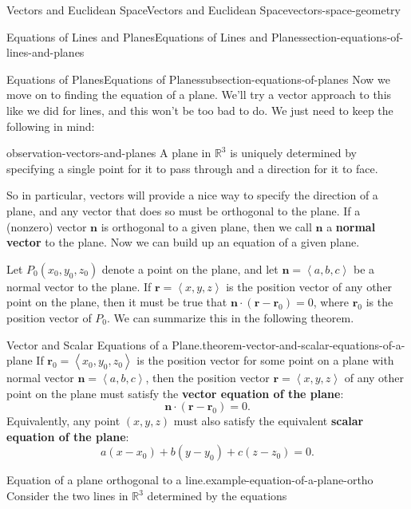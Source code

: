 \documentclass[oneside,10pt,]{book}
\newcommand{\terminology}[1]{\textbf{#1}}
\numberwithin{equation}{section}
\newcommand{\RR}{\mathbb{R}}
\newcommand{\vv}[1]{\mathbf{#1}}
\newcommand{\dotprod}[1]{\left\langle #1 \right\rangle}
\begin{document}
\begin{chapterptx}{Vectors and Euclidean Space}{}{Vectors and Euclidean Space}{}{}{vectors-space-geometry}
\begin{sectionptx}{Equations of Lines and Planes}{}{Equations of Lines and Planes}{}{}{section-equations-of-lines-and-planes}
\begin{subsectionptx}{Equations of Planes}{}{Equations of Planes}{}{}{subsection-equations-of-planes}
Now we move on to finding the equation of a plane. We'll try a vector approach to this like we did for lines, and this won't be too bad to do. We just need to keep the following in mind:%
\begin{observation}{}{observation-vectors-and-planes}%
\hypertarget{p-1216}{}%
A plane in \(\RR^{3}\) is uniquely determined by specifying a single point for it to pass through and a direction for it to face.%
\end{observation}
\hypertarget{p-1217}{}%
So in particular, vectors will provide a nice way to specify the direction of a plane, and any vector that does so must be orthogonal to the plane. If a (nonzero) vector \(\vv{n}\) is orthogonal to a given plane, then we call \(\vv{n}\) a \terminology{normal vector} to the plane. Now we can build up an equation of a given plane.%
\par
\hypertarget{p-1218}{}%
Let \(P_{0}(x_{0},y_{0},z_{0})\) denote a point on the plane, and let \(\vv{n} = \dotprod{a,b,c}\) be a normal vector to the plane. If \(\vv{r}=\dotprod{x,y,z}\) is the position vector of any other point on the plane, then it must be true that \(\vv{n}\cdot(\vv{r}-\vv{r}_{0}) = 0\), where \(\vv{r}_{0}\) is the position vector of \(P_{0}\). We can summarize this in the following theorem.%
\begin{theorem}{Vector and Scalar Equations of a Plane.}{}{theorem-vector-and-scalar-equations-of-a-plane}%
\hypertarget{p-1219}{}%
If \(\vv{r}_{0} = \dotprod{x_{0},y_{0},z_{0}}\) is the position vector for some point on a plane with normal vector \(\vv{n} = \dotprod{a,b,c}\), then the position vector \(\vv{r} = \dotprod{x,y,z}\) of any other point on the plane must satisfy the \terminology{vector equation of the plane}:%
%
\begin{equation*}
\vv{n}\cdot(\vv{r}-\vv{r}_{0}) = 0.
\end{equation*}
\hypertarget{p-1220}{}%
Equivalently, any point \((x,y,z)\) must also satisfy the equivalent \terminology{scalar equation of the plane}:%
%
\begin{equation*}
a(x-x_{0})+b(y-y_{0})+c(z-z_{0}) = 0.
\end{equation*}
\end{theorem}
\begin{example}{Equation of a plane orthogonal to a line.}{example-equation-of-a-plane-ortho}%
\hypertarget{p-1221}{}%
Consider the two lines in \(\RR^{3}\) determined by the equations%
%
\begin{align*}

\end{align*}
\end{example}
\end{subsectionptx}
\end{sectionptx}
\end{chapterptx}
\end{document}
